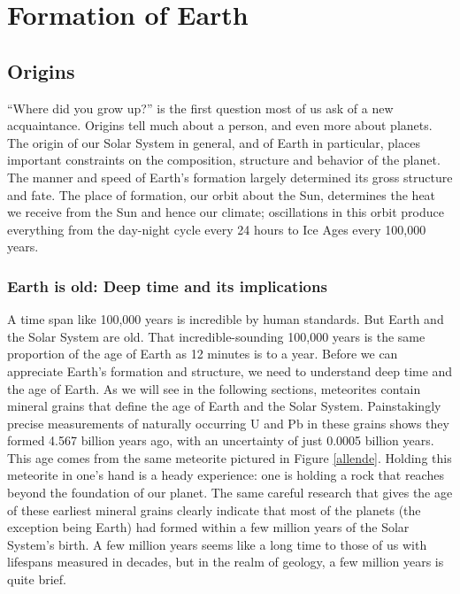 \section{Formation of Earth}
\subsection{Origins}
``Where did you grow up?'' is the first question most of us ask of a new acquaintance. Origins tell much about a person, and even more about planets. The origin of our Solar System in general, and of Earth in particular, places important constraints on the composition, structure and behavior of the planet. The manner and speed of Earth's formation largely determined its gross structure and fate. The place of formation, our orbit about the Sun, determines the heat we receive from the Sun and hence our climate; oscillations in this orbit produce everything from the day-night cycle every 24 hours to Ice Ages every 100,000 years. 

\subsubsection{Earth is old: Deep time and its implications}
A time span like 100,000 years is incredible by human standards. But Earth and the Solar System are old. That incredible-sounding 100,000 years is the same proportion of the age of Earth as 12 minutes is to a year. Before we can appreciate Earth's formation and structure, we need to understand deep time and the age of Earth. As we will see in the following sections, meteorites contain mineral grains that define the age of Earth and the Solar System. Painstakingly precise measurements of naturally occurring U and Pb in these grains shows they formed 4.567 billion years ago, with an uncertainty of just 0.0005 billion years. This age comes from the same meteorite pictured in Figure \ref{allende}. Holding this meteorite in one's hand is a heady experience: one is holding a rock that reaches beyond the foundation of our planet. The same careful research that gives the age of these earliest mineral grains clearly indicate that most of the planets (the exception being Earth) had formed within a few million years of the Solar System's birth. A few million years seems like a long time to those of us with lifespans measured in decades, but in the realm of geology, a few million years is quite brief.\\

